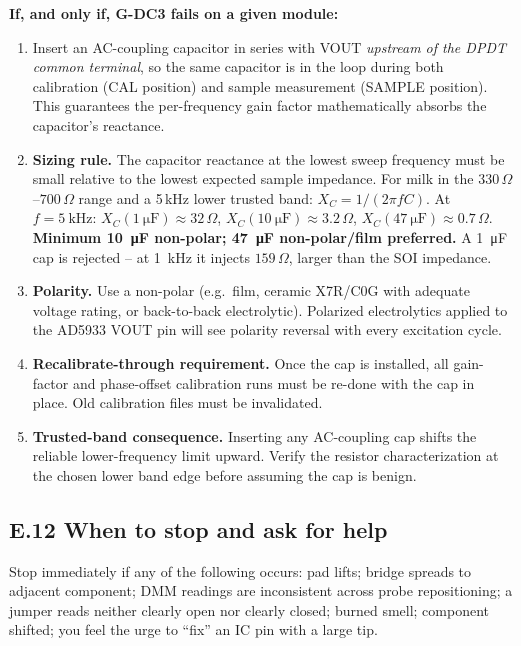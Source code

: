 \documentclass[11pt,a4paper]{article}
\newcommand{\Rohm}[1]{\ensuremath{#1\,\Omega}}
\begin{document}
\begin{rulebox}
\textbf{If, and only if, G-DC3 fails on a given module:}
\begin{enumerate}
\item Insert an AC-coupling capacitor in series with VOUT \emph{upstream of the DPDT common terminal}, so the same capacitor is in the loop during both calibration (CAL position) and sample measurement (SAMPLE position). This guarantees the per-frequency gain factor mathematically absorbs the capacitor's reactance.
\item \textbf{Sizing rule.} The capacitor reactance at the lowest sweep frequency must be small relative to the lowest expected sample impedance. For milk in the \Rohm{330}--\Rohm{700} range and a 5\,kHz lower trusted band: $X_C = 1/(2\pi f C)$. At $f=\SI{5}{\kilo\hertz}$: $X_C(\SI{1}{\micro\farad})\approx\Rohm{32}$, $X_C(\SI{10}{\micro\farad})\approx\Rohm{3.2}$, $X_C(\SI{47}{\micro\farad})\approx\Rohm{0.7}$. \textbf{Minimum \SI{10}{\micro\farad} non-polar; \SI{47}{\micro\farad} non-polar/film preferred.} A \SI{1}{\micro\farad} cap is rejected -- at \SI{1}{\kilo\hertz} it injects \Rohm{159}, larger than the SOI impedance.
\item \textbf{Polarity.} Use a non-polar (e.g.\ film, ceramic X7R/C0G with adequate voltage rating, or back-to-back electrolytic). Polarized electrolytics applied to the AD5933 VOUT pin will see polarity reversal with every excitation cycle.
\item \textbf{Recalibrate-through requirement.} Once the cap is installed, all gain-factor and phase-offset calibration runs must be re-done with the cap in place. Old calibration files must be invalidated.
\item \textbf{Trusted-band consequence.} Inserting any AC-coupling cap shifts the reliable lower-frequency limit upward. Verify the resistor characterization at the chosen lower band edge before assuming the cap is benign.
\end{enumerate}
\end{rulebox}

\subsection{E.12 When to stop and ask for help}

Stop immediately if any of the following occurs: pad lifts; bridge spreads to adjacent component; DMM readings are inconsistent across probe repositioning; a jumper reads neither clearly open nor clearly closed; burned smell; component shifted; you feel the urge to ``fix'' an IC pin with a large tip.
\end{document}
